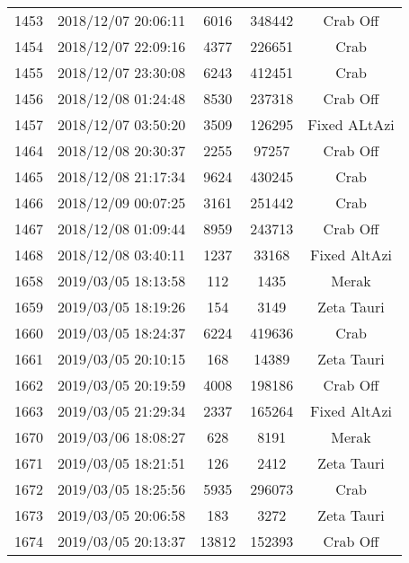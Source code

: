 \begin{table}[ht]
\begin{tabular}{lcccc}
1453 & 2018/12/07 20:06:11  &   6016     & 348442 & Crab Off    \\
1454 & 2018/12/07 22:09:16  &   4377     & 226651 &  Crab \\ %
1455 & 2018/12/07 23:30:08  &   6243     & 412451 &  Crab \\ %
1456 & 2018/12/08 01:24:48  &  8530     & 237318 & Crab Off \\ %
1457 & 2018/12/07 03:50:20  &  3509     & 126295 & Fixed ALtAzi\\ %
1464 & 2018/12/08 20:30:37 &  2255 & 97257 & Crab Off \\ %
1465 & 2018/12/08 21:17:34 &  9624 & 430245 & Crab\\ %
1466 & 2018/12/09 00:07:25 &  3161 & 251442 & Crab \\ %
1467 & 2018/12/08 01:09:44 &  8959 & 243713 & Crab Off \\ %
1468 & 2018/12/08 03:40:11 &  1237 & 33168 &  Fixed AltAzi\\ %
1658 & 2019/03/05 18:13:58 &  112 & 1435 & Merak \\  
1659 & 2019/03/05 18:19:26 &  154 & 3149 & Zeta Tauri \\  
1660 & 2019/03/05 18:24:37 &  6224  & 419636 & Crab \\ %
1661 & 2019/03/05 20:10:15 &  168 & 14389 & Zeta Tauri \\  
1662 & 2019/03/05 20:19:59 &  4008 & 198186 & Crab Off \\   
1663 & 2019/03/05 21:29:34 &  2337 & 165264 &  Fixed AltAzi \\  
1670 & 2019/03/06 18:08:27 &  628    &   8191      &  Merak\\
1671 & 2019/03/05 18:21:51 &  126        &   2412   & Zeta Tauri \\
1672 & 2019/03/05 18:25:56 &  5935    &   296073   &  Crab \\ %
1673 & 2019/03/05 20:06:58 &  183      &   3272     & Zeta Tauri\\ %
1674 & 2019/03/05 20:13:37 &  13812      &    152393 & Crab Off  \\ %

\hline\hline
\end{tabular}
\end{table}

